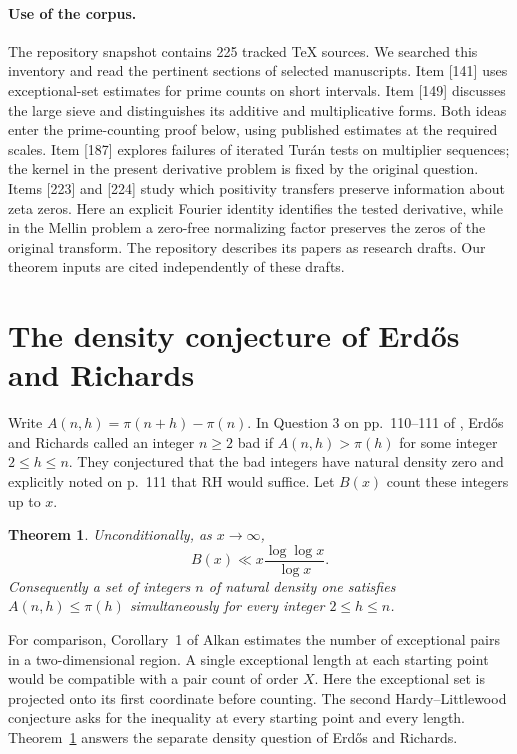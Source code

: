 \documentclass[11pt,a4paper]{article}
\newtheorem{theorem}{Theorem}[section]
\begin{document}
\paragraph{Use of the corpus.}
The repository snapshot \cite{vmrc} contains 225 tracked TeX sources.
We searched this inventory and read the pertinent sections of selected
manuscripts. Item [141] uses exceptional-set estimates for prime counts
on short intervals. Item [149] discusses the large sieve and distinguishes
its additive and multiplicative forms. Both ideas enter the prime-counting
proof below, using published estimates at the required scales.
Item [187] explores failures of iterated Tur\'an tests on multiplier
sequences; the kernel in the present derivative problem is fixed by the
original question. Items [223] and [224] study which positivity transfers
preserve information about zeta zeros. Here an explicit Fourier identity
identifies the tested derivative, while in the Mellin problem a zero-free
normalizing factor preserves the zeros of the original transform.
The repository describes its papers as research drafts. Our theorem
inputs are cited independently of these drafts.

\section{The density conjecture of Erd\H{o}s and Richards}
\label{sec:erdos-richards}
Write $A(n,h)=\pi(n+h)-\pi(n)$. In Question 3 on pp.~110--111 of
\cite{er}, Erd\H{o}s and Richards called an integer $n\ge2$ bad if
$A(n,h)>\pi(h)$ for some integer $2\le h\le n$. They conjectured
that the bad integers have natural density zero and explicitly noted
on p.~111 that RH would suffice. Let $B(x)$ count these integers up to $x$.

\begin{theorem}\label{thm:er-density}
Unconditionally, as $x\to\infty$,
\[
 B(x)\ll x\frac{\log\log x}{\log x}.
\]
Consequently a set of integers $n$ of natural density one satisfies
$A(n,h)\le\pi(h)$ simultaneously for every integer $2\le h\le n$.
\end{theorem}

For comparison, Corollary~1 of Alkan \cite{alkan} estimates the number of
exceptional pairs in a two-dimensional region. A single exceptional
length at each starting point would be compatible with a pair count of
order $X$. Here the exceptional set is projected onto its first
coordinate before counting. The second Hardy--Littlewood conjecture
asks for the inequality at every starting point and every length.
Theorem~\ref{thm:er-density} answers the separate density question of
Erd\H{o}s and Richards.
\end{document}
